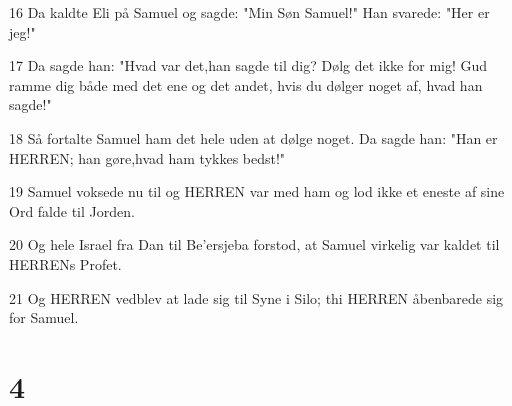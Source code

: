 \par 16 Da kaldte Eli på Samuel og sagde: "Min Søn Samuel!" Han svarede: "Her er jeg!"
\par 17 Da sagde han: "Hvad var det,han sagde til dig? Dølg det ikke for mig! Gud ramme dig både med det ene og det andet, hvis du dølger noget af, hvad han sagde!"
\par 18 Så fortalte Samuel ham det hele uden at dølge noget. Da sagde han: "Han er HERREN; han gøre,hvad ham tykkes bedst!"
\par 19 Samuel voksede nu til og HERREN var med ham og lod ikke et eneste af sine Ord falde til Jorden.
\par 20 Og hele Israel fra Dan til Be'ersjeba forstod, at Samuel virkelig var kaldet til HERRENs Profet.
\par 21 Og HERREN vedblev at lade sig til Syne i Silo; thi HERREN åbenbarede sig for Samuel.

\chapter{4}

